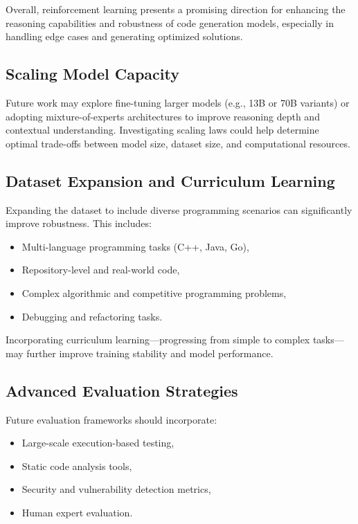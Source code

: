 Overall, reinforcement learning presents a promising direction for enhancing the reasoning capabilities and robustness of code generation models, especially in handling edge cases and generating optimized solutions.

\subsection{Scaling Model Capacity}

Future work may explore fine-tuning larger models (e.g., 13B or 70B variants) or adopting mixture-of-experts architectures to improve reasoning depth and contextual understanding. Investigating scaling laws could help determine optimal trade-offs between model size, dataset size, and computational resources.

\subsection{Dataset Expansion and Curriculum Learning}

Expanding the dataset to include diverse programming scenarios can significantly improve robustness. This includes:
\begin{itemize}
    \item Multi-language programming tasks (C++, Java, Go),
    \item Repository-level and real-world code,
    \item Complex algorithmic and competitive programming problems,
    \item Debugging and refactoring tasks.
\end{itemize}

Incorporating curriculum learning—progressing from simple to complex tasks—may further improve training stability and model performance.

\subsection{Advanced Evaluation Strategies}

Future evaluation frameworks should incorporate:
\begin{itemize}
    \item Large-scale execution-based testing,
    \item Static code analysis tools,
    \item Security and vulnerability detection metrics,
    \item Human expert evaluation.
\end{itemize}

